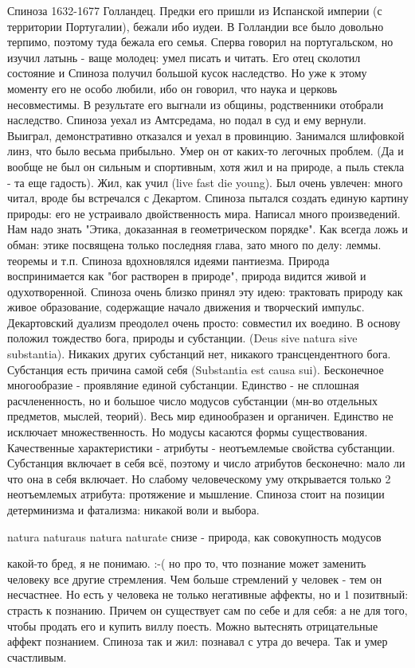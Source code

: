 Спиноза 1632-1677 Голландец.
Предки его пришли из Испанской империи (с территории Португалии), бежали ибо иудеи. В Голландии все было довольно терпимо, поэтому туда бежала его семья. Сперва говорил на португальском, но изучил латынь - ваще молодец: умел писать и читать. Его отец сколотил состояние и Спиноза получил большой кусок наследство. Но уже к этому моменту его не особо любили, ибо он говорил, что наука и церковь несовместимы. В результате его выгнали из общины, родственники отобрали наследство. Спиноза уехал из Амтсредама, но подал в суд и ему вернули. Выиграл, демонстративно отказался и уехал в провинцию. Занимался шлифовкой линз, что было весьма прибыльно. Умер он от каких-то легочных проблем. (Да и вообще не был он сильным и спортивным, хотя жил и на природе, а пыль стекла - та еще гадость). Жил, как учил (live fast die young).  Был очень увлечен: много читал, вроде бы встречался с Декартом. Спиноза пытался создать единую картину природы: его не устраивало двойственность мира. Написал много произведений. Нам надо знать "Этика, доказанная в геометрическом порядке". Как всегда ложь и обман: этике посвящена только последняя глава, зато много по делу: леммы. теоремы и т.п. Спиноза вдохновлялся идеями пантиезма. Природа воспринимается как "бог растворен в природе", природа видится живой и одухотворенной. Спиноза очень близко принял эту идею: трактовать природу как живое образование, содержащие начало движения и творческий импульс. Декартовский дуализм преодолел очень просто: совместил их воедино. В основу положил тождество бога, природы и субстанции. (Deus sive natura sive substantia). Никаких других субстанций нет, никакого трансцендентного бога. Субстанция есть причина самой себя (Substantia est causa sui). Бесконечное многообразие - проявляние единой субстанции. Единство - не сплошная расчлененность, но и большое число модусов субстанции (мн-во отдельных предметов, мыслей, теорий). Весь мир единообразен и органичен. Единство не исключает множественность. Но модусы касаются формы существования.
Качественные характеристики - атрибуты - неотъемлемые свойства субстанции. Субстанция включает в себя всё, поэтому и число атрибутов бесконечно: мало ли что она в себя включает. Но слабому человеческому уму открывается только 2 неотъемлемых атрибута: протяжение и мышление.
Спиноза стоит на позиции детерминизма и фатализма: никакой воли и выбора.

natura naturaus
natura naturate     снизе - природа, как совокупность модусов

какой-то бред, я не понимаю. :-( но про то, что познание может заменить человеку все другие стремления.
Чем больше стремлений у человек - тем он несчастнее. Но есть у человека не только негативные аффекты, но и 1 позитвный: страсть к познанию. Причем он существует сам по себе и для себя: а не для того, чтобы продать его и купить виллу поесть. Можно вытеснять отрицательные аффект познанием. Спиноза так и жил: познавал с утра до вечера. Так и умер счастливым.

